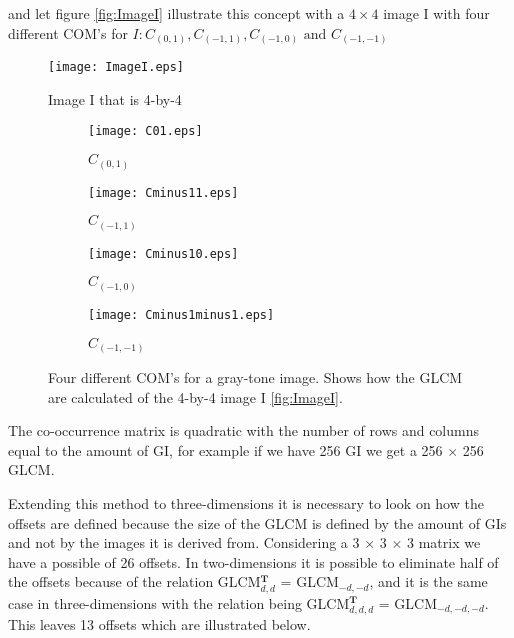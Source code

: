 and let figure \ref{fig:ImageI} illustrate this concept with a $4 \times 4$ image I with four different COM's for $I: C_{(0,1)}, C_{(-1,1)}, C_{(-1,0)} \text{ and } C_{(-1,-1)}$

\begin{figure}[H]
  \centering
  \texttt{[image: ImageI.eps]}
  \caption{Image I that is 4-by-4}\label{fig:ImageI}
    \begin{subfigure}{.24\textwidth}
      \centering
      \texttt{[image: C01.eps]}
      \caption{$C_{(0,1)}$}\label{fig:c01}
    \end{subfigure}
    \begin{subfigure}{.24\textwidth}
      \centering
      \texttt{[image: Cminus11.eps]}
      \caption{$C_{(-1,1)}$}\label{fig:cminus11}
    \end{subfigure}
    \begin{subfigure}{.24\textwidth}
      \centering
      \texttt{[image: Cminus10.eps]}
      \caption{$C_{(-1,0)}$}\label{fig:cminus10}
    \end{subfigure}
    \begin{subfigure}{.24\textwidth}
      \centering
      \texttt{[image: Cminus1minus1.eps]}
      \caption{$C_{(-1,-1)}$}\label{fig:cminus1minus1}
    \end{subfigure}
    \caption{Four different COM's for a gray-tone image. Shows how the GLCM are calculated of the 4-by-4 image I \ref{fig:ImageI}.}
\end{figure}

The co-occurrence matrix is quadratic with the number of rows and columns equal to the amount of GI, for example if we have 256 GI we get a 256 $\times$ 256 GLCM.

Extending this method to three-dimensions it is necessary to look on how the offsets are defined because the size of the GLCM is defined by the amount of GIs and not by the images it is derived from. Considering a 3 $\times$ 3 $\times$ 3 matrix we have a possible of 26 offsets. In two-dimensions it is possible to eliminate half of the offsets because of the relation GLCM$_{d,d}^\textbf{T}$ = GLCM$_{-d,-d}$, and it is the same case in three-dimensions with the relation being GLCM$_{d,d,d}^\textbf{T}$ = GLCM$_{-d,-d,-d}$. This leaves 13 offsets which are illustrated below.\\

